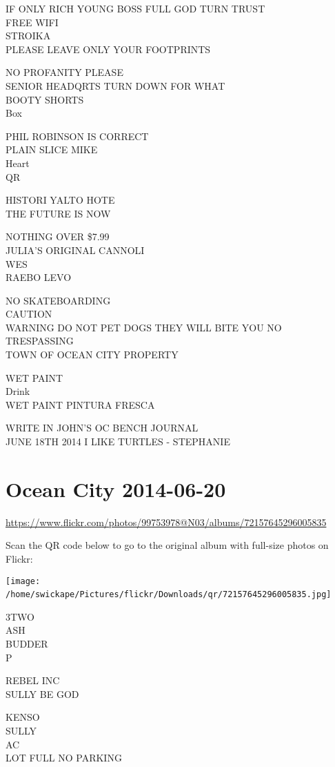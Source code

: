 \documentclass[10pt,letterpaper]{article}
\begin{document}
IF ONLY RICH YOUNG BOSS FULL GOD TURN TRUST\\
FREE WIFI\\
STROIKA\\
PLEASE LEAVE ONLY YOUR FOOTPRINTS

NO PROFANITY PLEASE\\
SENIOR HEADQRTS TURN DOWN FOR WHAT\\
BOOTY SHORTS\\
Box

PHIL ROBINSON IS CORRECT\\
PLAIN SLICE MIKE\\
Heart\\
QR

HISTORI YALTO HOTE\\
THE FUTURE IS NOW

NOTHING OVER \$7.99\\
JULIA'S ORIGINAL CANNOLI\\
WES\\
RAEBO LEVO

NO SKATEBOARDING\\
CAUTION\\
WARNING DO NOT PET DOGS THEY WILL BITE YOU NO TRESPASSING\\
TOWN OF OCEAN CITY PROPERTY

WET PAINT\\
Drink\\
WET PAINT PINTURA FRESCA

WRITE IN JOHN'S OC BENCH JOURNAL\\
JUNE 18TH 2014 I LIKE TURTLES {-} STEPHANIE
\

\section*{Ocean City 2014-06-20}

\url{https://www.flickr.com/photos/99753978@N03/albums/72157645296005835}

Scan the QR code below to go to the original album with full-size photos on Flickr:

\texttt{[image: /home/swickape/Pictures/flickr/Downloads/qr/72157645296005835.jpg]}
\

3TWO\\
ASH\\
BUDDER\\
P

REBEL INC\\
SULLY BE GOD

KENSO\\
SULLY\\
AC\\
LOT FULL NO PARKING
\end{document}
